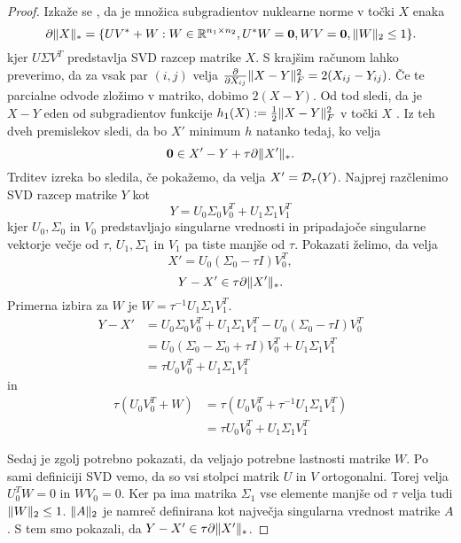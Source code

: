 \begin{proof}
Izkaže se \cite{CCS}, da je množica subgradientov nuklearne norme v točki $X$ enaka
\begin{equation}  \label{2807-0932}  
    \partial\lVert X\rVert_* = \{UV^* + W: W \in \mathbb{R}^{n_1 \times n_2}, U^*W = \mathbf{0}, WV = \mathbf{0}, \lVert W\rVert_2 \leq 1 \}.
\end{equation}
kjer $U \Sigma V^T$ predstavlja SVD razcep matrike $X$. S krajšim računom lahko preverimo, da za vsak par $(i,j)$ velja $\frac{\partial}{\partial X_{ij}}\lVert X-Y\rVert_F^2 = 2(X_{ij} - Y_{ij})$. 
Če te parcialne odvode zložimo v matriko, dobimo $2(X-Y)$. Od tod sledi, da je $X-Y$ eden od subgradientov funkcije $h_1(X):=\frac{1}{2}\lVert X-Y\rVert_F^2$ v točki $X$ \cite[razdel. 3.1.3]{boyd2004convex}.
Iz teh dveh premislekov sledi, da bo $X'$ minimum $h$ natanko tedaj, ko velja 
\begin{equation} \label{2807-0940}
    \mathbf{0} \in X' - Y + \tau \partial\lVert X'\rVert_*.
\end{equation}
Trditev izreka bo sledila, če pokažemo, da velja $X' = \mathcal{D}_\tau(Y)$. Najprej razčlenimo SVD razcep matrike $Y$ kot 
\[
    Y = U_0\Sigma_0V_0^T + U_1\Sigma_1V_1^T
\]
kjer $U_0, \Sigma_0$ in $V_0$ predstavljajo singularne vrednosti in pripadajoče singularne vektorje večje od $\tau$, $U_1, \Sigma_1$ in $V_1$ pa tiste manjše od $\tau$. Pokazati želimo, da velja 
\[
    X' = U_0(\Sigma_0 - \tau I)V_0^T,
\] 
\begin{equation} \label{2807-0934}
    Y- X' \in \tau \partial \lVert X'\rVert_*.
\end{equation}
 Primerna izbira za $W$  je $W= \tau^{-1} U_1 \Sigma_1 V_1^T$. 
\begin{align*}
    Y-X' &= U_0\Sigma_0V_0^T + U_1\Sigma_1V_1^T - U_0(\Sigma_0 - \tau I)V_0^T \\ 
    &= U_0(\Sigma_0 - \Sigma_0 + \tau I)V_0^T + U_1\Sigma_1 V_1^T  \\
    &= \tau U_0 V_0^T + U_1\Sigma_1 V_1^T
\end{align*}
in 
\begin{align*}
    \tau(U_0 V_0^T + W) &= \tau(U_0V_0^T + \tau^{-1} U_1 \Sigma_1 V_1^T)\\ 
    &= \tau U_0 V_0^T + U_1 \Sigma_1 V_1^T 
\end{align*}

Sedaj je zgolj potrebno pokazati, da veljajo potrebne lastnosti matrike $W$.
Po sami definiciji SVD vemo, da so vsi stolpci matrik $U$ in $V$ ortogonalni. Torej velja $U_0^TW = 0$ in $WV_0 = 0$. Ker pa ima matrika $\Sigma_1$ vse elemente manjše od $\tau$ velja tudi $\lVert W\rVert_2 \leq 1$. $\lVert A\rVert_2$ je namreč definirana kot največja singularna vrednost matrike $A$. S tem smo pokazali, da $Y - X' \in \tau \partial \lVert X'\rVert_*$.
\end{proof}
